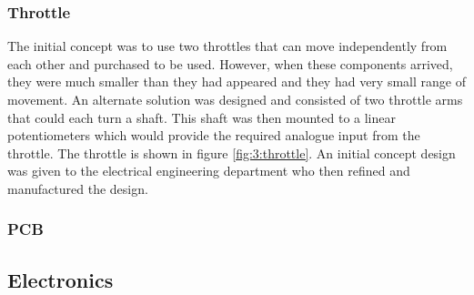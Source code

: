 		\subsubsection{Throttle}
		The initial concept was to use two throttles that can move independently from each other and %
		purchased to be used. However, when these components arrived, they were much smaller than they had appeared and they had very small range of movement. An alternate solution was designed and consisted of two throttle arms that could each turn a shaft. This shaft was then mounted to a linear potentiometers which would provide the required analogue input from the throttle. The throttle is shown in figure \ref{fig:3:throttle}. An initial concept design was given to the electrical engineering department who then refined and manufactured the design. 
		\par
		\subsubsection{PCB}
		
	\subsection{Electronics}\par
		

